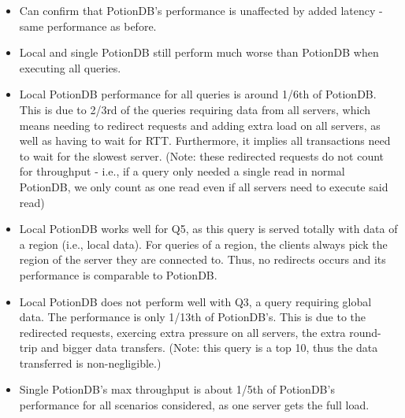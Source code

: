 \documentclass[sigplan,10pt]{acmart}
\begin{document}
\begin{itemize}
	\item Can confirm that PotionDB's performance is unaffected by added latency - same performance as before.
	\item Local and single PotionDB still perform much worse than PotionDB when executing all queries.
	\item Local PotionDB performance for all queries is around 1/6th of PotionDB. This is due to 2/3rd of the queries requiring data from all servers, which means needing to redirect requests and adding extra load on all servers, as well as having to wait for RTT. Furthermore, it implies all transactions need to wait for the slowest server. (Note: these redirected requests do not count for throughput - i.e., if a query only needed a single read in normal PotionDB, we only count as one read even if all servers need to execute said read)
	\item Local PotionDB works well for Q5, as this query is served totally with data of a region (i.e., local data). For queries of a region, the clients always pick the region of the server they are connected to. Thus, no redirects occurs and its performance is comparable to PotionDB.
	\item Local PotionDB does not perform well with Q3, a query requiring global data. The performance is only 1/13th of PotionDB's. This is due to the redirected requests, exercing extra pressure on all servers, the extra round-trip and bigger data transfers. (Note: this query is a top 10, thus the data transferred is non-negligible.)
	\item Single PotionDB's max throughput is about 1/5th of PotionDB's performance for all scenarios considered, as one server gets the full load.
\end{itemize}
\end{document}
